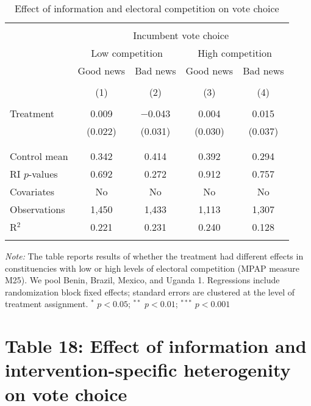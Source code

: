 \documentclass[]{article}
\begin{document}
\begin{table}[!htbp] \centering 
  \caption{Effect of information and electoral competition on vote choice} 
  \label{competition} 
\begin{tabular}{@{\extracolsep{1pt}}lcccc} 
\\[-1.8ex]\hline 
\hline \\[-1.8ex] 
 & \multicolumn{4}{c}{Incumbent vote choice} \\ 
\cline{2-5} 
& \multicolumn{2}{c}{Low competition} &\multicolumn{2}{c}{High competition} \\
\cline{2-5}
 & Good news & Bad news & Good news & Bad news \\ 
\\[-1.8ex] & (1) & (2) & (3) & (4)\\ 
\hline \\[-1.8ex] 
 Treatment & 0.009 & $-$0.043 & 0.004 & 0.015 \\ 
  & (0.022) & (0.031) & (0.030) & (0.037) \\ 
  & & & & \\ 
\hline \\[-1.8ex] 
Control mean & 0.342 & 0.414 & 0.392 & 0.294 \\ 
RI $p$-values & 0.692 & 0.272 & 0.912 & 0.757 \\ 
Covariates & No & No & No & No \\ 
Observations & 1,450 & 1,433 & 1,113 & 1,307 \\ 
R$^{2}$ & 0.221 & 0.231 & 0.240 & 0.128 \\ 
\hline 
\hline \\[-1.8ex] 
\end{tabular} 
\begin{flushleft}\textit{Note:} The table reports results of whether the treatment had different effects in constituencies with low or high levels of electoral competition (MPAP measure M25). We pool Benin, Brazil, Mexico, and Uganda 1. Regressions include randomization block fixed effects; standard errors are clustered at the level of treatment assignment. $^*$ $p<0.05$; $^{**}$ $p<0.01$; $^{***}$ $p<0.001$ \end{flushleft}
\end{table}

\clearpage

\section{Table 18: Effect of information and intervention-specific
heterogenity on vote
choice}\label{table-18-effect-of-information-and-intervention-specific-heterogenity-on-vote-choice}
\end{document}
